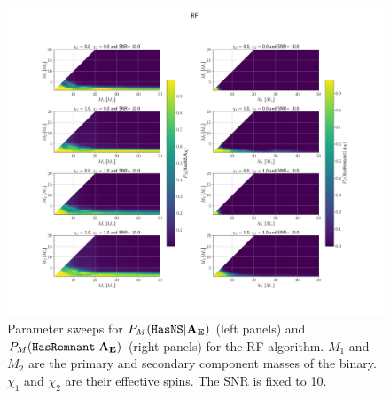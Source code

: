 \begin{figure}%
\includegraphics[width=0.9\linewidth]{RF_parameter_sweep}
    \caption{Parameter sweeps for $P_M({{\tt HasNS}} |\bf{A_E})$ (left panels) and $P_M({{\tt HasRemnant}} |\bf{A_E})$ (right panels) for the \ac{RF} algorithm. $M_1$ and $M_2$ are the primary and secondary component masses of the binary. $\chi_1$ and $\chi_2$ are their effective spins. The \ac{SNR} is fixed to 10.}
\label{fig:param_sweep_RF}
\end{figure}

